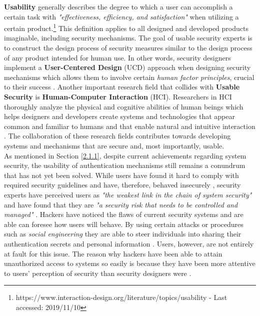 \textbf{Usability} generally describes the degree to which a user can accomplish a certain task with \textit{"effectiveness, efficiency, and satisfaction"} when utilizing a certain product.\footnote{https://www.interaction-design.org/literature/topics/usability - Last accessed: 2019/11/10} This definition applies to all designed and developed products imaginable, including security mechanisms. The goal of usable security experts is to construct the design process of security measures similar to the design process of any product intended for human use. In other words, security designers implement a \textbf{User-Centered Design} (UCD) approach when designing security mechanisms which allows them to involve certain \textit{human factor principles}, crucial to their success \cite{Adams:1999:UE:322796.322806, sasse, Butz2014}. Another important research field that collides with \textbf{Usable Security} is \textbf{Human-Computer Interaction} (HCI). Researchers in HCI thoroughly analyze the physical and cognitive abilities of human beings which helps designers and developers create systems and technologies that appear common and familiar to humans and that enable natural and intuitive interaction \cite{Butz2014}. The collaboration of these research fields contributes towards developing systems and mechanisms that are secure and, most importantly, usable.\\ 

As mentioned in Section \ref{2.1.1}, despite current achievements regarding system security, the usability of authentication mechanisms still remains a conundrum that has not yet been solved. While users have found it hard to comply with required security guidelines and have, therefore, behaved insecurely \cite{Adams:1999:UE:322796.322806, sasse}, security experts have perceived users as \textit{"the weakest link in the chain of system security"} \cite{sasse} and have found that they are \textit{"a security risk that needs to be controlled and managed"}  \cite{Adams:1999:UE:322796.322806}. Hackers have noticed the flaws of current security systems and are able can foresee how users will behave. By using certain attacks or procedures such as  \textit{social engineering} they are able to steer individuals into sharing their authentication secrets and personal information \cite{Adams:1999:UE:322796.322806, sasse}. Users, however, are not entirely at fault for this issue. The reason why hackers have been able to attain unauthorized access to systems so easily is because  they have been more attentive to users' perception of security than security designers were \cite{Adams:1999:UE:322796.322806}. 

